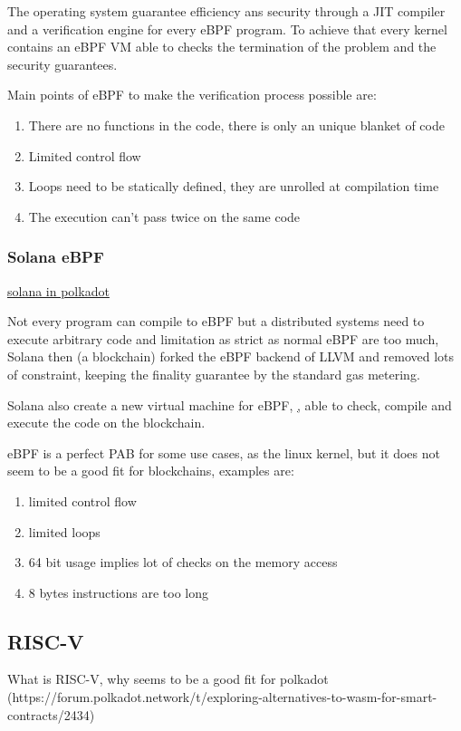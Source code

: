 \documentclass[../main.tex]{subfiles}
\begin{document}
The operating system guarantee efficiency ans security through a JIT compiler and a verification engine for every eBPF program. To achieve that every kernel contains an eBPF VM able to checks the termination of the problem and the security guarantees.

Main points of eBPF to make the verification process possible are:
\begin{enumerate}
  \item There are no functions in the code, there is only an unique blanket of code
  \item Limited control flow
  \item Loops need to be statically defined, they are unrolled at compilation time
  \item The execution can't pass twice on the same code
\end{enumerate}

\subsubsection{Solana eBPF}

\href{https://forum.polkadot.network/t/ebpf-contracts-hackathon/1084}{solana in polkadot}

Not every program can compile to eBPF but a distributed systems need to execute arbitrary code and limitation as strict as normal eBPF are too much, Solana then (a blockchain) forked the eBPF backend of LLVM and removed lots of constraint, keeping the finality guarantee by the standard gas metering.

Solana also create a new virtual machine for eBPF, \href{https://github.com/qmonnet/rbpf}, able to check, compile and execute the code on the blockchain.

eBPF is a perfect PAB for some use cases, as the linux kernel, but it does not seem to be a good fit for blockchains, examples are:
\begin{enumerate}
  \item limited control flow
  \item limited loops
  \item 64 bit usage implies lot of checks on the memory access
  \item 8 bytes instructions are too long
\end{enumerate}


\subsection{RISC-V}

What is RISC-V, why seems to be a good fit for polkadot (https://forum.polkadot.network/t/exploring-alternatives-to-wasm-for-smart-contracts/2434)
\end{document}
